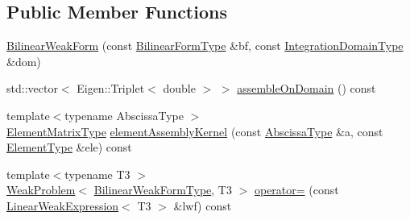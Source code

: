\subsection*{Public Member Functions}
\begin{DoxyCompactItemize}
\item 
\hyperlink{structmodel_1_1_bilinear_weak_form_ad85473f68a5f03754748bfed6363839e}{Bilinear\+Weak\+Form} (const \hyperlink{structmodel_1_1_bilinear_weak_form_a13052aab9ae19efbffa3d881ceb184f9}{Bilinear\+Form\+Type} \&bf, const \hyperlink{structmodel_1_1_bilinear_weak_form_a537e7d0cf8fa78efb38cfe017e56196b}{Integration\+Domain\+Type} \&dom)
\item 
std\+::vector$<$ Eigen\+::\+Triplet$<$ double $>$ $>$ \hyperlink{structmodel_1_1_bilinear_weak_form_ac9f20a54e02b79fbbd7e5807749df982}{assemble\+On\+Domain} () const 
\item 
{\footnotesize template$<$typename Abscissa\+Type $>$ }\\\hyperlink{structmodel_1_1_bilinear_weak_form_a690ee10521b3f2330a0648fab59a2aff}{Element\+Matrix\+Type} \hyperlink{structmodel_1_1_bilinear_weak_form_af3286385919d927eb406d2eb9e03da51}{element\+Assembly\+Kernel} (const \hyperlink{structmodel_1_1_bilinear_weak_form_ad1e097cb2bb06eaa186ff66db5e8932e}{Abscissa\+Type} \&a, const \hyperlink{structmodel_1_1_bilinear_weak_form_a43a6e034f88493f8a1e5af511c16378b}{Element\+Type} \&ele) const 
\item 
{\footnotesize template$<$typename T3 $>$ }\\\hyperlink{classmodel_1_1_weak_problem}{Weak\+Problem}$<$ \hyperlink{structmodel_1_1_bilinear_weak_form_aa34216f35460fbae1533245b653038de}{Bilinear\+Weak\+Form\+Type}, T3 $>$ \hyperlink{structmodel_1_1_bilinear_weak_form_ada9c73895c8014902e42ad72173a107e}{operator=} (const \hyperlink{structmodel_1_1_linear_weak_expression}{Linear\+Weak\+Expression}$<$ T3 $>$ \&lwf) const 
\end{DoxyCompactItemize}
